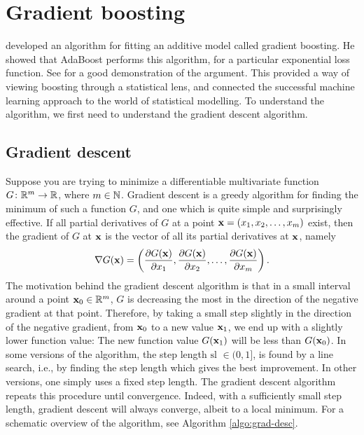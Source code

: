 \section{Gradient boosting}
\citet{friedman2001} developed an algorithm for fitting an additive model called gradient boosting. He showed that AdaBoost performs this algorithm, for a particular exponential loss function. See \citet{ESL} for a good demonstration of the argument. This provided a way of viewing boosting through a statistical lens, and connected the successful machine learning approach to the world of statistical modelling. To understand the algorithm, we first need to understand the gradient descent algorithm.

\subsection{Gradient descent}
Suppose you are trying to minimize a differentiable multivariate function $G\colon\mathbb{R}^m\to\mathbb{R}$, where $m\in\mathbb{N}$. Gradient descent is a greedy algorithm for finding the minimum of such a function $G$, and one which is quite simple and surprisingly effective. If all partial derivatives of $G$ at a point $\mathbf{x}=(x_1,x_2,\ldots,x_m)$ exist, then the gradient of $G$ at $\mathbf{x}$ is the vector of all its partial derivatives at $\mathbf{x}$, namely
\begin{equation}
    \nabla G(\mathbf{x})=\left(\frac{\partial G(\mathbf{x})}{\partial x_1},\frac{\partial G(\mathbf{x})}{\partial x_2},\ldots,\frac{\partial G(\mathbf{x})}{\partial x_m}\right).
\end{equation}
The motivation behind the gradient descent algorithm is that in a small interval around a point $\mathbf{x}_0\in\mathbb{R}^m$, $G$ is decreasing the most in the direction of the negative gradient at that point. Therefore, by taking a small step slightly in the direction of the negative gradient, from $\mathbf{x}_0$ to a new value $\mathbf{x}_1$, we end up with a slightly lower function value: The new function value $G(\mathbf{x}_1)$ will be less than $G(\mathbf{x}_0)$. In some versions of the algorithm, the step length $\text{sl }\in(0,1]$, is found by a line search, i.e., by finding the step length which gives the best improvement. In other versions, one simply uses a fixed step length. The gradient descent algorithm repeats this procedure until convergence. Indeed, with a sufficiently small step length, gradient descent will always converge, albeit to a local minimum. For a schematic overview of the algorithm, see Algorithm \ref{algo:grad-desc}.
